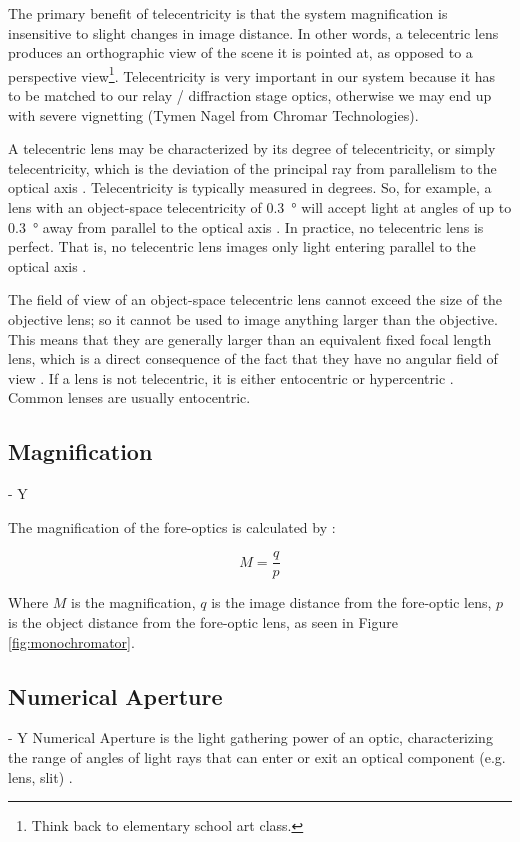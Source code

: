 The primary benefit of telecentricity is that the system magnification is insensitive to slight changes in image distance. In other words, a telecentric lens produces an orthographic view of the scene it is pointed at, as opposed to a perspective view\footnote{Think back to elementary school art class.}. Telecentricity is very important in our system because it has to be matched to our relay / diffraction stage optics, otherwise we may end up with severe vignetting (Tymen Nagel from Chromar Technologies).

A telecentric lens may be characterized by its degree of telecentricity, or simply telecentricity, which is the deviation of the principal ray from parallelism to the optical axis \cite{Sischka2015-jc}. Telecentricity is typically measured in degrees. So, for example, a lens with an object-space telecentricity of \SI{0.3}{\degree} will accept light at angles of up to \SI{0.3}{\degree} away from parallel to the optical axis \cite{Sischka2015-jc}. In practice, no telecentric lens is perfect. That is, no telecentric lens images only light entering parallel to the optical axis \cite{Sischka2015-jc}.

The field of view of an object-space telecentric lens cannot exceed the size of the objective lens; so it cannot be used to image anything larger than the objective. This means that they are generally larger than an equivalent fixed focal length lens, which is a direct consequence of the fact that they have no angular field of view \cite{Sischka2015-jc}. If a lens is not telecentric, it is either entocentric or hypercentric \cite{Wikipedia_contributors_undated-tx}. Common lenses are usually entocentric.


\subsection{Magnification} - Y

The magnification of the fore-optics is calculated by \cite{Horiba_entrance_optics}:

\begin{equation}
    M = \frac{q}{p}
\end{equation}

Where $M$ is the magnification, $q$ is the image distance from the fore-optic lens, $p$ is the object distance from the fore-optic lens, as seen in Figure \ref{fig:monochromator}.

\subsection{Numerical Aperture} - Y
Numerical Aperture is the light gathering power of an optic, characterizing the range of angles of light rays that can enter or exit an optical component (e.g. lens, slit) \cite{Horiba_monochromator}.

